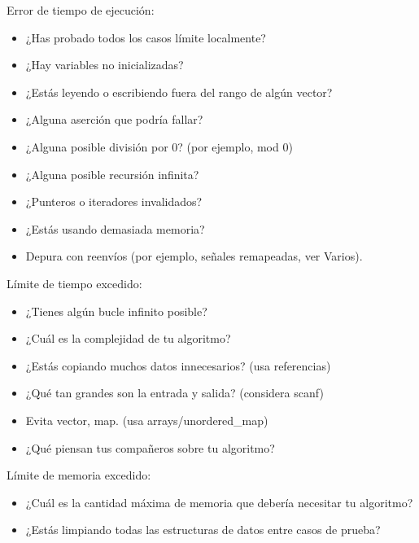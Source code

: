 Error de tiempo de ejecución:
\begin{itemize}
	\item ¿Has probado todos los casos límite localmente?
	\item ¿Hay variables no inicializadas?
	\item ¿Estás leyendo o escribiendo fuera del rango de algún vector?
	\item ¿Alguna aserción que podría fallar?
	\item ¿Alguna posible división por 0? (por ejemplo, mod 0)
	\item ¿Alguna posible recursión infinita?
	\item ¿Punteros o iteradores invalidados?
	\item ¿Estás usando demasiada memoria?
	\item Depura con reenvíos (por ejemplo, señales remapeadas, ver Varios).
\end{itemize}

Límite de tiempo excedido:
\begin{itemize}
	\item ¿Tienes algún bucle infinito posible?
	\item ¿Cuál es la complejidad de tu algoritmo?
	\item ¿Estás copiando muchos datos innecesarios? (usa referencias)
	\item ¿Qué tan grandes son la entrada y salida? (considera scanf)
	\item Evita vector, map. (usa arrays/unordered\_map)
	\item ¿Qué piensan tus compañeros sobre tu algoritmo?
\end{itemize}

Límite de memoria excedido:
\begin{itemize}
	\item ¿Cuál es la cantidad máxima de memoria que debería necesitar tu algoritmo?
	\item ¿Estás limpiando todas las estructuras de datos entre casos de prueba?
\end{itemize}

